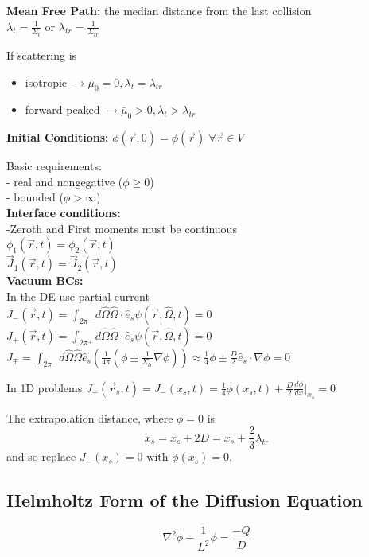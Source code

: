 \documentclass{report}
\newcommand{\tab}{\-\hspace{1cm}}
\newcommand{\hh}[1]{\subsection*{#1}}
\newcommand{\Xs}{\Sigma}
\newcommand{\pos}{\vec{r}}
\newcommand{\cur}{\vec{J}}
\newcommand{\Oh}{\hat{\Omega}}
\newcommand{\rt}{(\pos,t)}
\newcommand{\rOt}{(\pos,\Oh,t)}
\begin{document}
\textbf{Mean Free Path:} the median distance from the last collision\\
$\lambda_t = \frac{1}{\Xs_t}$ or $\lambda_{tr} = \frac{1}{\Xs_{tr}}$

If scattering is 
\begin{itemize}
    \item isotropic $\rightarrow \bar{\mu}_0 = 0, \lambda_t = \lambda_{tr}$
    \item forward peaked $\rightarrow \bar{\mu}_0 > 0, \lambda_t > \lambda_{tr}$
\end{itemize}

\textbf{Initial Conditions:} $\phi(\pos,0) = \phi(\pos) \; \forall \pos \in V$

Basic requirements:\\
- real and nongegative ($\phi \geq 0$)\\
- bounded ($\phi > \infty$) \\

\textbf{Interface conditions:} \\
-Zeroth and First moments must be continuous\\
\tab$\phi_1\rt = \phi_2\rt$\\
\tab$\cur_1\rt = \cur_2\rt$\\

\textbf{Vacuum BCs:}\\
In the DE use partial current\\
\tab $J_{-}\rt = \int_{2\pi^{-}} d\Oh \Oh \cdot \hat{e}_s \psi\rOt = 0$\\
\tab $J_{+}\rt = \int_{2\pi^{+}} d\Oh \Oh \cdot \hat{e}_s \psi\rOt = 0$\\

$J_{\mp} = \int_{2\pi^{-}} d\Oh \Oh \hat{e}_s \left( \frac{1}{4\pi} \left( \phi \pm \frac{1}{\Xs_{tr}} \nabla \phi \right)\right) \approx \frac{1}{4}\phi \pm \frac{D}{2}\hat{e}_s \cdot \nabla \phi = 0$

In 1D problems
$J_{-}(\pos_s,t) = J_{-}(x_s,t) = \frac{1}{4}\phi(x_s,t) + \frac{D}{2}\frac{d\phi}{dx}|_{x_s} = 0$

The extrapolation distance, where $\phi = 0$ is
$$\tilde{x}_s = x_s + 2D = x_s + \frac{2}{3}\lambda_{tr}$$
and so replace $J_{-}(x_s) = 0$ with $ \phi(\tilde{x}_s) = 0$.


\hh{Helmholtz Form of the Diffusion Equation}

$$\nabla^2 \phi - \frac{1}{L^2}\phi = \frac{-Q}{D}$$
\end{document}
